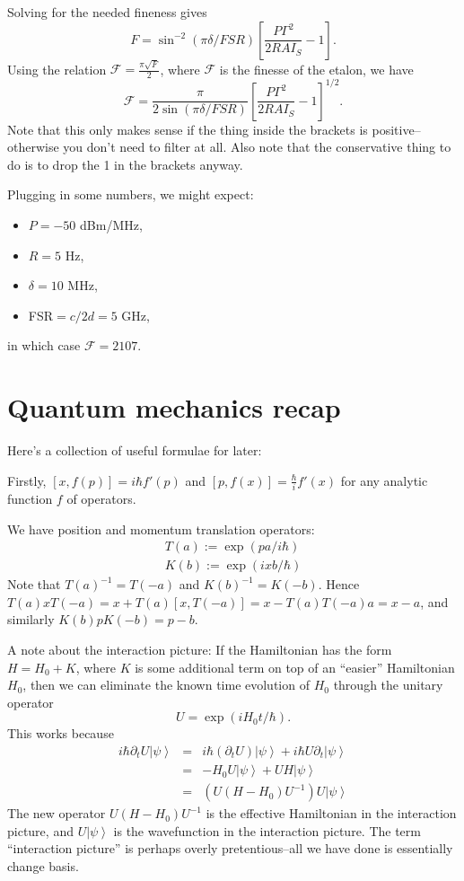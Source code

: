 \documentclass[aps,twocolumn,prb,floatfix,amsmath,amssymb,groupedaddress]{revtex4}
\begin{document}
Solving for the needed fineness gives \[F = \sin^{-2}\left(\pi\delta/FSR\right) \left[\frac{P\Gamma^2}{2RAI_S}-1\right].\]
Using the relation $\mathcal{F} = \frac{\pi \sqrt{F}}{2}$, where $\mathcal{F}$ is the finesse of the etalon, we have \[\mathcal{F} = \frac{\pi}{2\sin\left(\pi\delta/FSR\right)} \left[\frac{P\Gamma^2}{2RAI_S}-1\right]^{1/2}.\]
Note that this only makes sense if the thing inside the brackets is positive--otherwise you don't need to filter at all.  Also note that the conservative thing to do is to drop the 1 in the brackets anyway. 

Plugging in some numbers, we might expect: 
\begin{itemize}
\item $P=-50$ dBm/MHz, 
\item $R=5$ Hz,
\item $\delta=10$ MHz,
\item FSR$=c/2d=5$ GHz,
\end{itemize}
in which case $\mathcal{F} = 2107$.

\newpage

\section{Quantum mechanics recap}
Here's a collection of useful formulae for later:

Firstly, $[x,f(p)] = i\hbar f'(p)$ and $[p,f(x)] = \frac{\hbar}{i} f'(x)$ for any analytic function $f$ of operators.

We have position and momentum translation operators:
\begin{eqnarray*}
T(a):=\exp(pa/i\hbar) \\
K(b):=\exp(ixb/\hbar)
\end{eqnarray*}
Note that $T(a)^{-1} = T(-a)$ and $K(b)^{-1} = K(-b)$.  Hence $T(a)x T(-a) = x + T(a)[x,T(-a)] = x - T(a)T(-a)a = x-a$, and similarly $K(b)p K(-b) = p - b$.

A note about the interaction picture:  If the Hamiltonian has the form $H = H_0 + K$, where $K$ is some additional term on top of an ``easier'' Hamiltonian $H_0$, then we can eliminate the known time evolution of $H_0$ through the unitary operator \[U=\exp(iH_0t/\hbar).\]
This works because
\begin{eqnarray*}
i\hbar \partial_t U \left|\psi\right> & = & i\hbar (\partial_t U) \left|\psi\right> + i\hbar U \partial_t \left|\psi\right> \\
 & = & - H_0 U \left|\psi\right> + U H \left|\psi\right> \\
& = & \left( U \left(H-H_0\right) U^{-1} \right) U \left|\psi\right>
\end{eqnarray*}
The new operator $U(H-H_0)U^{-1}$ is the effective Hamiltonian in the interaction picture, and $U\left|\psi\right>$ is the wavefunction in the interaction picture.  The term ``interaction picture'' is perhaps overly pretentious--all we have done is essentially change basis. 
\end{document}
